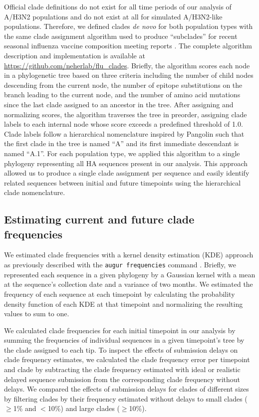 \documentclass[9pt,lineno]{elife}
\begin{document}
Official clade definitions do not exist for all time periods of our analysis of A/H3N2 populations and do not exist at all for simulated A/H3N2-like populations.
Therefore, we defined clades \emph{de novo} for both population types with the same clade assignment algorithm used to produce ``subclades'' for recent seasonal influenza vaccine composition meeting reports \citep{Huddleston2024}.
The complete algorithm description and implementation is available at \url{https://github.com/neherlab/flu_clades}.
Briefly, the algorithm scores each node in a phylogenetic tree based on three criteria including the number of child nodes descending from the current node, the number of epitope substitutions on the branch leading to the current node, and the number of amino acid mutations since the last clade assigned to an ancestor in the tree.
After assigning and normalizing scores, the algorithm traverses the tree in preorder, assigning clade labels to each internal node whose score exceeds a predefined threshold of 1.0.
Clade labels follow a hierarchical nomenclature inspired by Pangolin \citep{OToole2021} such that the first clade in the tree is named ``A'' and its first immediate descendant is named ``A.1''.
For each population type, we applied this algorithm to a single phylogeny representing all HA sequences present in our analysis.
This approach allowed us to produce a single clade assignment per sequence and easily identify related sequences between initial and future timepoints using the hierarchical clade nomenclature.

\subsection{Estimating current and future clade frequencies}

We estimated clade frequencies with a kernel density estimation (KDE) approach as previously described \citep{Huddleston2020} with the \texttt{augur frequencies} command \citep{Huddleston2021}.
Briefly, we represented each sequence in a given phylogeny by a Gaussian kernel with a mean at the sequence's collection date and a variance of two months.
We estimated the frequency of each sequence at each timepoint by calculating the probability density function of each KDE at that timepoint and normalizing the resulting values to sum to one.

We calculated clade frequencies for each initial timepoint in our analysis by summing the frequencies of individual sequences in a given timepoint's tree by the clade assigned to each tip.
To inspect the effects of submission delays on clade frequency estimates, we calculated the clade frequency error per timepoint and clade by subtracting the clade frequency estimated with ideal or realistic delayed sequence submission from the corresponding clade frequency without delays.
We compared the effects of submission delays for clades of different sizes by filtering clades by their frequency estimated without delays to small clades ($\ge$1\% and $<$10\%) and large clades ($\ge$10\%).
\end{document}
